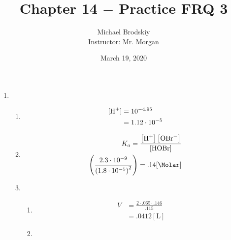 \documentclass[12pt]{article}
\title{Chapter 14 $-$ Practice FRQ 3}
\date{March 19, 2020}
\author{Michael Brodskiy\\ \small Instructor: Mr. Morgan}
\begin{document}
\maketitle

\begin{enumerate}

  \item

    \begin{enumerate}

      \item 

        \begin{equation}
          \begin{split}
            [\ce{H+}]&= 10^{-4.95}\\
            &= 1.12\cdot10^{-5}
          \end{split}
          \label{1}
        \end{equation}

      \item 

        \begin{equation}
          \begin{split}
            K_a=\frac{\left[ \ce{H+} \right]\left[ \ce{OBr-} \right]}{\left[ \ce{HOBr} \right]}\\
            \left( \frac{2.3\cdot10^{-9}}{\left( 1.8\cdot10^{-5} \right)^2} \right)=.14[\si{\Molar}]\\
          \end{split}
          \label{2}
        \end{equation}

      \item 

        \begin{enumerate}

          \item 

            \begin{equation}
              \begin{split}
                V&=\frac{2\cdot.065\cdot.146}{.115}\\
                &= .0412[\si{\liter}]
              \end{split}
              \label{3}
            \end{equation}

          \item 


\end{enumerate}
\end{enumerate}
\end{enumerate}
\end{document}
